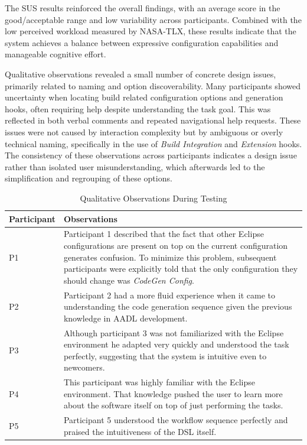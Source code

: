 The \gls{SUS} results reinforced the overall findings, with an average score in the good/acceptable range and low variability across participants. Combined with the low perceived workload measured by NASA-\gls{TLX}, these results indicate that the system achieves a balance between expressive configuration capabilities and manageable cognitive effort. 

Qualitative observations revealed a small number of concrete design issues, primarily related to naming and option discoverability. Many participants showed uncertainty when locating build related configuration options and generation hooks, often requiring help despite understanding the task goal. This was reflected in both verbal comments and repeated navigational help requests. These issues were not caused by interaction complexity but by ambiguous or overly technical naming, specifically in the use of \textit{Build Integration} and \textit{Extension} hooks. The consistency of these observations across participants indicates a design issue rather than isolated user misunderstanding, which afterwards led to the simplification and regrouping of these options.

\begin{table}[htbp]
	\centering
	\caption{Qualitative Observations During Testing}
	\label{tab:usability_observations}
	\begin{tabular}{p{3cm} p{10cm}}
		\toprule
		\textbf{Participant} & \textbf{Observations} \\
		\midrule
		P1 & Participant 1 described that the fact that other Eclipse configurations are present on top on the current configuration generates confusion. To minimize this problem, subsequent participants were explicitly told that the only configuration they should change was \textit{CodeGen Config}. \\
		P2 & Participant 2 had a more fluid experience when it came to understanding the code generation sequence given the previous knowledge in \gls{AADL} development. \\
		P3 & Although participant 3 was not familiarized with the Eclipse environment he adapted very quickly and understood the task perfectly, suggesting that the system is intuitive even to newcomers. \\
		P4 & This participant was highly familiar with the Eclipse environment. That knowledge pushed the user to learn more about the software itself on top of just performing the tasks. \\
		P5 & Participant 5 understood the workflow sequence perfectly and praised the intuitiveness of the \gls{DSL} itself. \\
		\bottomrule
	\end{tabular}
\end{table}

